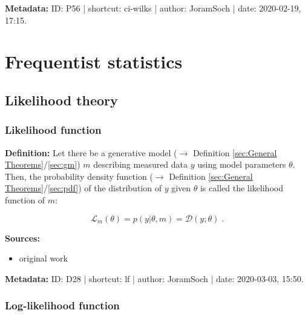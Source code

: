 \documentclass[a4paper,12pt,twoside]{book}
\begin{document}
\vspace{1em}
\textbf{Metadata:} ID: P56 | shortcut: ci-wilks | author: JoramSoch | date: 2020-02-19, 17:15.
\vspace{1em}



\pagebreak
\section{Frequentist statistics}

\subsection{Likelihood theory}

\subsubsection[\textit{Likelihood function}]{Likelihood function} \label{sec:lf}
\setcounter{equation}{0}

\textbf{Definition:} Let there be a generative model ($\rightarrow$ Definition \ref{sec:General Theorems}/\ref{sec:gm}) $m$ describing measured data $y$ using model parameters $\theta$. Then, the probability density function ($\rightarrow$ Definition \ref{sec:General Theorems}/\ref{sec:pdf}) of the distribution of $y$ given $\theta$ is called the likelihood function of $m$:

\begin{equation} \label{eq:lf-lf}
\mathcal{L}_m(\theta) = p(y|\theta,m) = \mathcal{D}(y; \theta) \; .
\end{equation}


\vspace{1em}
\textbf{Sources:}
\begin{itemize}
\item original work\end{itemize}


\vspace{1em}
\textbf{Metadata:} ID: D28 | shortcut: lf | author: JoramSoch | date: 2020-03-03, 15:50.
\vspace{1em}



\subsubsection[\textit{Log-likelihood function}]{Log-likelihood function} \label{sec:llf}
\setcounter{equation}{0}
\end{document}
